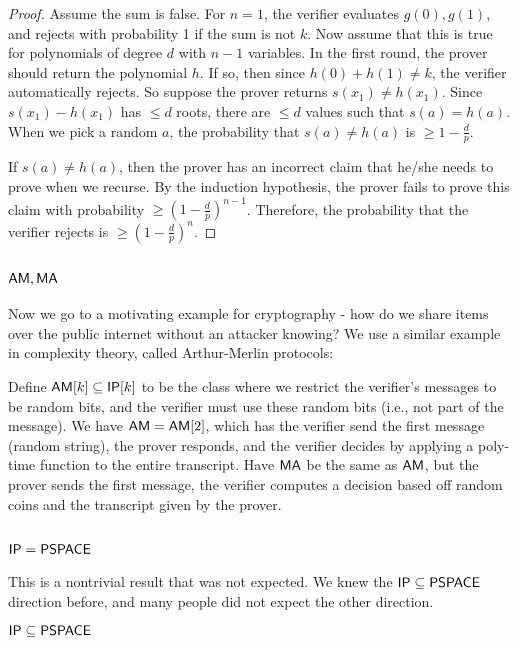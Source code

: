 \begin{proof}
\par Assume the sum is false. For $n=1$, the verifier evaluates $g(0), g(1)$, and rejects with probability 1 if the sum is not $k$. Now assume that this is true for polynomials of degree $d$ with $n-1$ variables. In the first round, the prover should return the polynomial $h$. If so, then since $h(0) + h(1) \ne k$, the verifier automatically rejects. So suppose the prover returns $s(x_1) \ne h(x_1)$. Since $s(x_1) - h(x_1)$ has $\le d$ roots, there are $\le d$ values such that $s(a) = h(a)$. When we pick a random $a$, the probability that $s(a) \ne h(a)$ is $\ge 1-\frac{d}{p}$. 

\par If $s(a) \ne h(a)$, then the prover has an incorrect claim that he/she needs to prove when we recurse. By the induction hypothesis, the prover fails to prove this claim with probability $\ge (1-\frac{d}{p})^{n-1}$. Therefore, the probability that the verifier rejects is $\ge (1-\frac{d}{p})^n$. 
\end{proof}

\subsection{${\mathsf{AM}}, {\mathsf{MA}}$}
Now we go to a motivating example for cryptography - how do we share items over the public internet without an attacker knowing? We use a similar example in complexity theory, called Arthur-Merlin protocols:

\begin{definition}
Define ${\mathsf{AM}}[k] \subseteq {\ensuremath{\mathsf{IP}}}[k]$ to be the class where we restrict the verifier's messages to be random bits, and the verifier must use these random bits (i.e., not part of the message). We have ${\mathsf{AM}} = {\mathsf{AM}}[2]$, which has the verifier send the first message (random string), the prover responds, and the verifier decides by applying a poly-time function to the entire transcript. Have ${\mathsf{MA}}$ be the same as ${\mathsf{AM}}$, but the prover sends the first message, the verifier computes a decision based off random coins and the transcript given by the prover.
\end{definition}

\subsection{${\mathsf{IP}} = {\mathsf{PSPACE}}$}
This is a nontrivial result that was not expected. We knew the ${\mathsf{IP}} \subseteq {\ensuremath{\mathsf{PSPACE}}}$ direction before, and many people did not expect the other direction. 
\begin{theorem}
${\mathsf{IP}} \subseteq {\ensuremath{\mathsf{PSPACE}}}$
\end{theorem}

